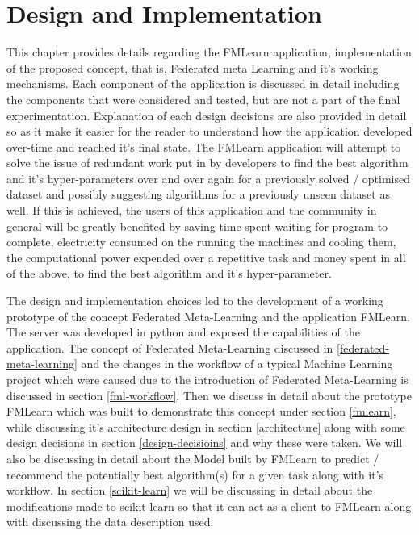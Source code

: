 \chapter{Design and Implementation}

This chapter provides details regarding the FMLearn application, implementation of the proposed concept, that is, Federated meta Learning and it's working mechanisms. Each component of the application is discussed in detail including the components that were considered and tested, but are not a part of the final experimentation. Explanation of each design decisions are also provided in detail so as it make it easier for the reader to understand how the application developed over-time and reached it's final state. The FMLearn application will attempt to solve the issue of redundant work put in by developers to find the best algorithm and it's hyper-parameters over and over again for a previously solved / optimised dataset and possibly suggesting algorithms for a previously unseen dataset as well. If this is achieved, the users of this application and the community in general will be greatly benefited by saving time spent waiting for program to complete, electricity consumed on the running the machines and cooling them, the computational power expended over a repetitive task and money spent in all of the above, to find the best algorithm and it's hyper-parameter.

The design and implementation choices led to the development of a working prototype of the concept Federated Meta-Learning and the application FMLearn. The server was developed in python and exposed the capabilities of the application. The concept of Federated Meta-Learning discussed in \ref{federated-meta-learning} and the changes in the workflow of a typical Machine Learning project which were caused due to the introduction of Federated Meta-Learning is discussed in section \ref{fml-workflow}. Then we discuss in detail about the prototype FMLearn which was built to demonstrate this concept under section \ref{fmlearn}, while discussing it's architecture design in section \ref{architecture} along with some design decisions in section \ref{design-decisioins} and why these were taken. We will also be discussing in detail about the Model built by FMLearn to predict / recommend the potentially best algorithm(s) for a given task along with it's workflow. In section \ref{scikit-learn} we will be discussing in detail about the modifications made to scikit-learn so that it can act as a client to FMLearn along with discussing the data description used.

